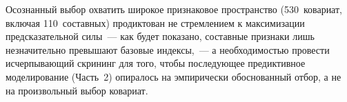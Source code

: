 Осознанный выбор охватить широкое признаковое пространство (530~ковариат, включая 110~составных) продиктован не стремлением к максимизации предсказательной силы~--- как будет показано, составные признаки лишь незначительно превышают базовые индексы,~--- а необходимостью провести исчерпывающий скрининг для того, чтобы последующее предиктивное моделирование (Часть~2) опиралось на эмпирически обоснованный отбор, а не на произвольный выбор ковариат.
